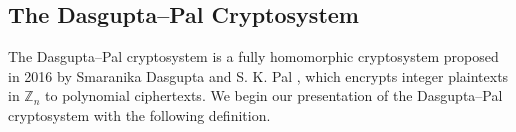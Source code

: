 


\subsection{The Dasgupta--Pal Cryptosystem}
The Dasgupta--Pal cryptosystem is a fully homomorphic cryptosystem proposed in 2016 by Smaranika Dasgupta and S. K. Pal \cite{dasgupta_design_2016}, which encrypts integer plaintexts in $\mathbb{Z}_n$ to polynomial ciphertexts. We begin our presentation of the Dasgupta--Pal cryptosystem with the following definition.

